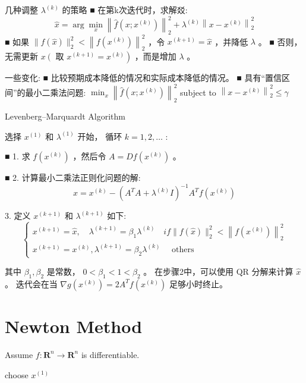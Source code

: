 几种调整 $ \lambda^{(k)} $ 的策略
■ 在第k次迭代时，求解㸚:
$$
\hat{x}=\arg \min _{x}\left\|\hat{f}\left(x ; x^{(k)}\right)\right\|_{2}^{2}+\lambda^{(k)}\left\|x-x^{(k)}\right\|_{2}^{2}
$$
■ 如果 $ \|f(\hat{x})\|_{2}^{2}<\left\|f\left(x^{(k)}\right)\right\|_{2}^{2} $ ，令 $ x^{(k+1)}=\hat{x} $ ，并降低 $ \lambda $ 。
■ 否则，无需更新 $ x\left(\right. $ 取 $ \left.x^{(k+1)}=x^{(k)}\right) $ ，而是增加 $ \lambda $ 。

一些变化:
■ 比较预期成本降低的情况和实际成本降低的情况。
■ 具有“置信区间”的最小二乘法问题:
$ \min _{x}\left\|\hat{f}\left(x ; x^{(k)}\right)\right\|_{2}^{2} $
subject to $ \left\|x-x^{(k)}\right\|_{2}^{2} \leq \gamma $

\begin{algorithm}
    \caption{Levenberg–Marquardt Algorithm}
    选择 $ x^{(1)} $ 和 $ \lambda^{(1)} $ 开始， 循环 $ k=1,2, \ldots $ :
    
■ 1. 求 $ f\left(x^{(k)}\right) $ ，然后令 $ A=D f\left(x^{(k)}\right) $ 。

■ 2. 计算最小二乘法正则化问题的解:
$$
\hat{x}=x^{(k)}-\left(A^{T} A+\lambda^{(k)} I\right)^{-1} A^{T} f\left(x^{(k)}\right)
$$

3. 定义 $ x^{(k+1)} $ 和 $ \lambda^{(k+1)} $ 如下:
$$
\left\{\begin{array}{c}

x^{(k+1)}=\hat{x}, \quad \lambda^{(k+1)}=\beta_{1} \lambda^{(k)} \quad i f\|f(\hat{x})\|_{2}^{2}<\left\|f\left(x^{(k)}\right)\right\|_{2}^{2} \\
x^{(k+1)}=x^{(k)}, \lambda^{(k+1)}=\beta_{2} \lambda^{(k)} \quad \text { others }
\end{array}\right.
$$


\end{algorithm}

其中 $ \beta_{1}, \beta_{2} $ 是常数， $ 0<\beta_{1}<1<\beta_{2} $ 。
在步骤2中，可以使用 $ \mathrm{QR} $ 分解来计算 $ \hat{x} $ 。
迭代会在当 $ \nabla g\left(x^{(k)}\right)=2 A^{T} f\left(x^{(k)}\right) $ 足够小时终止。


\section{Newton Method}

Assume $ f: \mathbf{R}^{n} \rightarrow \mathbf{R}^{n} $ is differentiable.

\begin{algorithm}
     choose $ x^{(1)} $\;
\end{algorithm}



